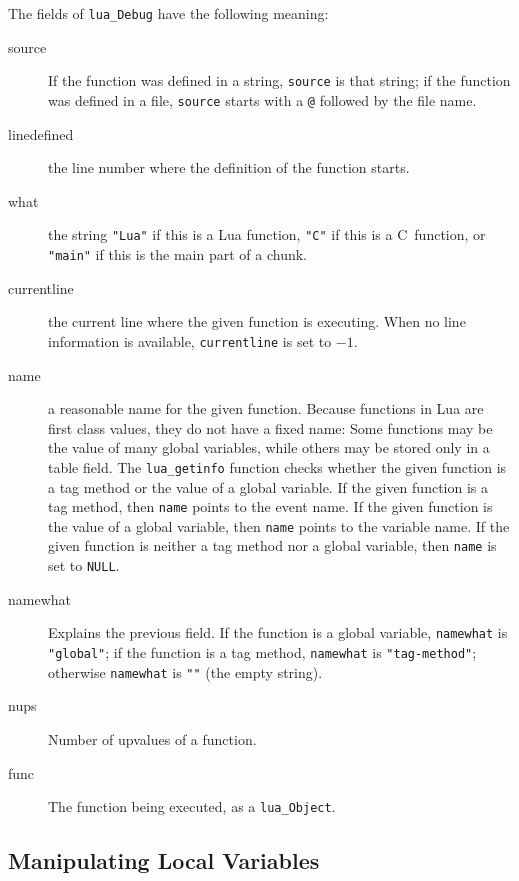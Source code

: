 \documentclass[11pt]{article}
\newcommand{\Math}[1]{$#1$}
\begin{document}
The fields of \verb|lua_Debug| have the following meaning:
\begin{description}

\item[source]
If the function was defined in a string,
\verb|source| is that string;
if the function was defined in a file,
\verb|source| starts with a \verb|@| followed by the file name.

\item[linedefined]
the line number where the definition of the function starts.

\item[what] the string \verb|"Lua"| if this is a Lua function,
\verb|"C"| if this is a C~function,
or \verb|"main"| if this is the main part of a chunk.

\item[currentline]
the current line where the given function is executing.
When no line information is available,
\verb|currentline| is set to \Math{-1}.

\item[name]
a reasonable name for the given function.
Because functions in Lua are first class values,
they do not have a fixed name:
Some functions may be the value of many global variables,
while others may be stored only in a table field.
The \verb|lua_getinfo| function checks whether the given
function is a tag method or the value of a global variable.
If the given function is a tag method,
then \verb|name| points to the event name.
If the given function is the value of a global variable,
then \verb|name| points to the variable name.
If the given function is neither a tag method nor a global variable,
then \verb|name| is set to \verb|NULL|.

\item[namewhat]
Explains the previous field.
If the function is a global variable,
\verb|namewhat| is \verb|"global"|;
if the function is a tag method,
\verb|namewhat| is \verb|"tag-method"|;
otherwise \verb|namewhat| is \verb|""| (the empty string).

\item[nups]
Number of upvalues of a function.

\item[func]
The function being executed, as a \verb|lua_Object|.

\end{description}


\subsection{Manipulating Local Variables}
\end{document}
